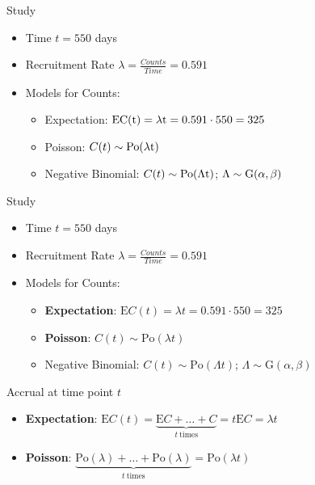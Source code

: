 \documentclass[english]{beamer}\usepackage[]{graphicx}\usepackage[]{xcolor}
\begin{document}
\begin{frame}{Study}

\begin{itemize}
\item Time $t = 550$ days
\item Recruitment Rate $\lambda = \frac{Counts}{Time} = 0.591$
\item Models for Counts:
	\begin{itemize}
	\item Expectation: $\rm{E}C(t) = \lambda t = 0.591 \cdot 550 = 325$
	\item Poisson: $C(t) \sim \rm{Po}(\lambda t)$
	\item Negative Binomial: $C(t) \sim \rm{Po} (\Lambda t)$; $\Lambda \sim \rm{G}(\alpha,\beta)$
	\end{itemize}
\end{itemize}

\end{frame}

\begin{frame}{Study}
\begin{itemize}
\item Time $t = 550$ days
\item Recruitment Rate $\lambda = \frac{Counts}{Time} = 0.591$
\item Models for Counts:
	\begin{itemize}
	\item \textbf{Expectation}: $\textrm{E}C(t) = \lambda t = 0.591 \cdot 550 = 325$
	\item \textbf{Poisson}: $C(t) \sim \textrm{Po}(\lambda t)$
	\item Negative Binomial: $C(t) \sim \textrm{Po} (\Lambda t)$; $\Lambda \sim \textrm{G}(\alpha,\beta)$
	\end{itemize}
\end{itemize}
\end{frame}

\begin{frame}{Accrual at time point $t$}
\begin{itemize}
\item \textbf{Expectation}: $\textrm{E}C(t) = \underbrace{\textrm{E} C +\ldots + C}_{t \ \text{times}} = t \textrm{E} C = \lambda t$
\item \textbf{Poisson}: $\underbrace{\textrm{Po} (\lambda) +\ldots +\textrm{Po} (\lambda)}_{t \ \text{times}} = \textrm{Po} (\lambda t)$
\end{itemize}
\end{frame}
\end{document}
